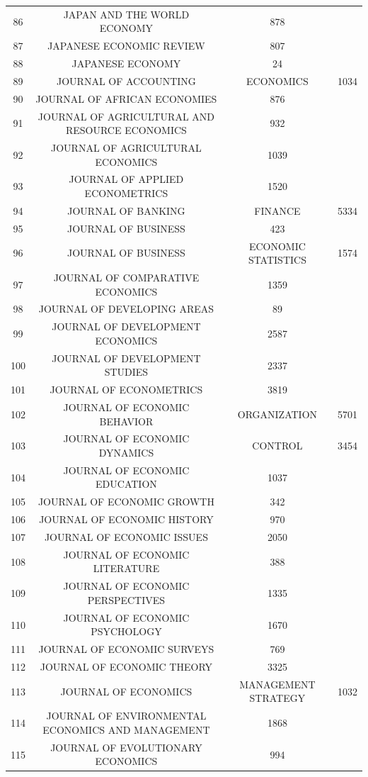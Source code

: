 \begin{tabular}{@{\extracolsep{5pt}} ccc}
86 & JAPAN AND THE WORLD ECONOMY & 878 \\ 
87 & JAPANESE ECONOMIC REVIEW & 807 \\ 
88 & JAPANESE ECONOMY & 24 \\ 
89 & JOURNAL OF ACCOUNTING & ECONOMICS & 1034 \\ 
90 & JOURNAL OF AFRICAN ECONOMIES & 876 \\ 
91 & JOURNAL OF AGRICULTURAL AND RESOURCE ECONOMICS & 932 \\ 
92 & JOURNAL OF AGRICULTURAL ECONOMICS & 1039 \\ 
93 & JOURNAL OF APPLIED ECONOMETRICS & 1520 \\ 
94 & JOURNAL OF BANKING & FINANCE & 5334 \\ 
95 & JOURNAL OF BUSINESS & 423 \\ 
96 & JOURNAL OF BUSINESS & ECONOMIC STATISTICS & 1574 \\ 
97 & JOURNAL OF COMPARATIVE ECONOMICS & 1359 \\ 
98 & JOURNAL OF DEVELOPING AREAS & 89 \\ 
99 & JOURNAL OF DEVELOPMENT ECONOMICS & 2587 \\ 
100 & JOURNAL OF DEVELOPMENT STUDIES & 2337 \\ 
101 & JOURNAL OF ECONOMETRICS & 3819 \\ 
102 & JOURNAL OF ECONOMIC BEHAVIOR & ORGANIZATION & 5701 \\ 
103 & JOURNAL OF ECONOMIC DYNAMICS & CONTROL & 3454 \\ 
104 & JOURNAL OF ECONOMIC EDUCATION & 1037 \\ 
105 & JOURNAL OF ECONOMIC GROWTH & 342 \\ 
106 & JOURNAL OF ECONOMIC HISTORY & 970 \\ 
107 & JOURNAL OF ECONOMIC ISSUES & 2050 \\ 
108 & JOURNAL OF ECONOMIC LITERATURE & 388 \\ 
109 & JOURNAL OF ECONOMIC PERSPECTIVES & 1335 \\ 
110 & JOURNAL OF ECONOMIC PSYCHOLOGY & 1670 \\ 
111 & JOURNAL OF ECONOMIC SURVEYS & 769 \\ 
112 & JOURNAL OF ECONOMIC THEORY & 3325 \\ 
113 & JOURNAL OF ECONOMICS & MANAGEMENT STRATEGY & 1032 \\ 
114 & JOURNAL OF ENVIRONMENTAL ECONOMICS AND MANAGEMENT & 1868 \\ 
115 & JOURNAL OF EVOLUTIONARY ECONOMICS & 994 \\ 

\end{tabular}
